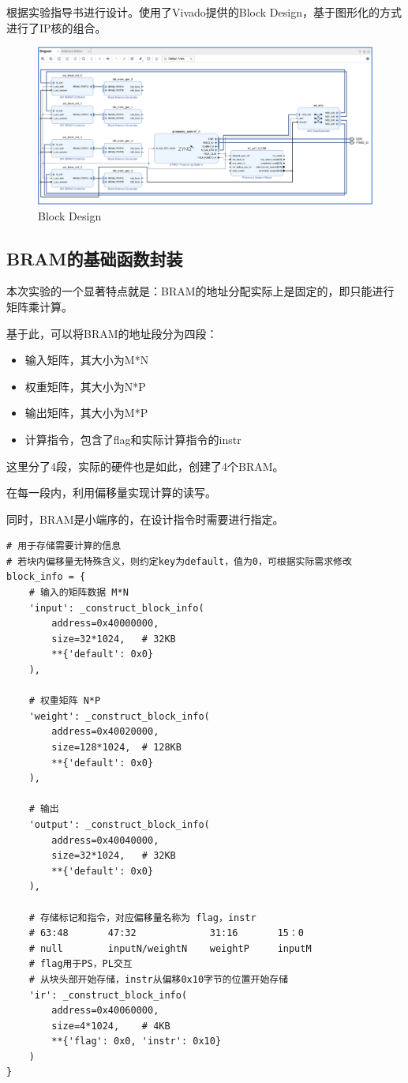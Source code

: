 \documentclass[12pt,a4paper]{article}
\begin{document}
根据实验指导书进行设计。使用了Vivado提供的Block Design，基于图形化的方式进行了IP核的组合。

\begin{figure}[htbp]
    \centering
    \includegraphics[width=\linewidth]{img/block_design.png}
    \caption{Block Design}
\end{figure} 

\subsection{BRAM的基础函数封装}

本次实验的一个显著特点就是：BRAM的地址分配实际上是固定的，即只能进行矩阵乘计算。

基于此，可以将BRAM的地址段分为四段：

\begin{itemize}
\item
  输入矩阵，其大小为M*N
\item
  权重矩阵，其大小为N*P
\item
  输出矩阵，其大小为M*P
\item
  计算指令，包含了flag和实际计算指令的instr
\end{itemize}

这里分了4段，实际的硬件也是如此，创建了4个BRAM。

在每一段内，利用偏移量实现计算的读写。

同时，BRAM是小端序的，在设计指令时需要进行指定。

\begin{lstlisting}
# 用于存储需要计算的信息
# 若块内偏移量无特殊含义，则约定key为default，值为0，可根据实际需求修改
block_info = {
    # 输入的矩阵数据 M*N
    'input': _construct_block_info(
        address=0x40000000,
        size=32*1024,   # 32KB
        **{'default': 0x0}
    ),

    # 权重矩阵 N*P
    'weight': _construct_block_info(
        address=0x40020000,
        size=128*1024,  # 128KB
        **{'default': 0x0}
    ),

    # 输出
    'output': _construct_block_info(
        address=0x40040000,
        size=32*1024,   # 32KB
        **{'default': 0x0}
    ),

    # 存储标记和指令，对应偏移量名称为 flag，instr
    # 63:48       47:32             31:16       15：0
    # null        inputN/weightN    weightP     inputM
    # flag用于PS，PL交互
    # 从块头部开始存储，instr从偏移0x10字节的位置开始存储
    'ir': _construct_block_info(
        address=0x40060000,
        size=4*1024,    # 4KB
        **{'flag': 0x0, 'instr': 0x10}
    )
}
\end{lstlisting}
\end{document}
